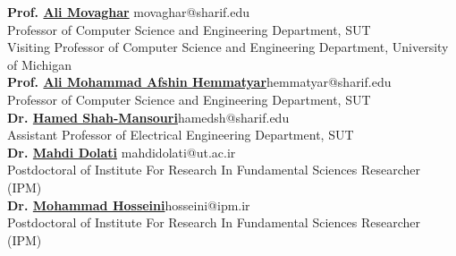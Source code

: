 \documentclass[11pt]{article}
\begin{document}
\textbf{Prof. \href{https://scholar.google.com/citations?user=BXNelwwAAAAJ\&hl=en}{\textbf{Ali Movaghar}}} \hfill movaghar@sharif.edu\\
Professor of Computer Science and Engineering Department, SUT \\
Visiting Professor of Computer Science and Engineering Department, University of Michigan\\
\textbf{Prof. \href{https://scholar.google.com/citations?user=wob0AskAAAAJ&hl=en&oi=ao}{\textbf{Ali Mohammad Afshin Hemmatyar}}}\hfill hemmatyar@sharif.edu\\
Professor of Computer Science and Engineering Department, SUT\\
\textbf{Dr. \href{https://scholar.google.com/citations?user=dcjIFccAAAAJ&hl=en&oi=ao}{\textbf{Hamed Shah-Mansouri}}}\hfill  hamedsh@sharif.edu\\
Assistant Professor of Electrical Engineering Department, SUT\\
\textbf{Dr. \href{https://scholar.google.com/citations?user=b7A2CXYAAAAJ&hl=en&oi=ao}{\textbf{Mahdi Dolati}}} \hfill  mahdidolati@ut.ac.ir\\ Postdoctoral of Institute For Research In Fundamental Sciences Researcher (IPM)\\
\textbf{Dr. \href{https://scholar.google.com/citations?user=iRO-DVoAAAAJ&hl=en&oi=ao}{\textbf{Mohammad Hosseini}}}\hfill  hosseini@ipm.ir \\ Postdoctoral of Institute For Research In Fundamental Sciences Researcher (IPM)\\
\end{document}

